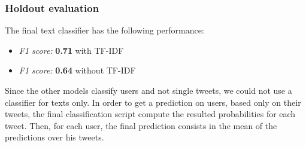 \subsubsection{Holdout evaluation}
The final text classifier has the following performance:
\begin{itemize}
	\item[\PencilRight] \textit{F1 score:} \textbf{0.71} with TF-IDF
	\item[\PencilRight] \textit{F1 score:} \textbf{0.64} without TF-IDF
\end{itemize}

Since the other models classify users and not single tweets, we could not use a classifier for texts only.
In order to get a prediction on users, based only on their tweets, the final classification script compute the resulted probabilities for each tweet. Then, for each user, the final prediction consists in the mean of the predictions over his tweets.